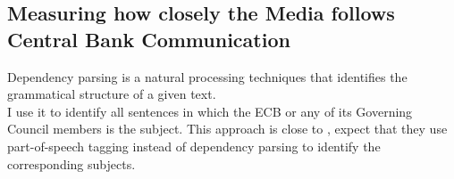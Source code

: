 \documentclass[review]{elsarticle}
\begin{document}
\subsection{Measuring how closely the Media follows Central Bank Communication}

Dependency parsing is a natural processing techniques that identifies the grammatical structure of a given text. 
\\
I use it to identify all sentences in which the ECB or any of its Governing Council members is the subject. This approach is close to \cite{Picaultetal2022}, expect that they use part-of-speech tagging instead of dependency parsing to identify the corresponding subjects.
\end{document}
